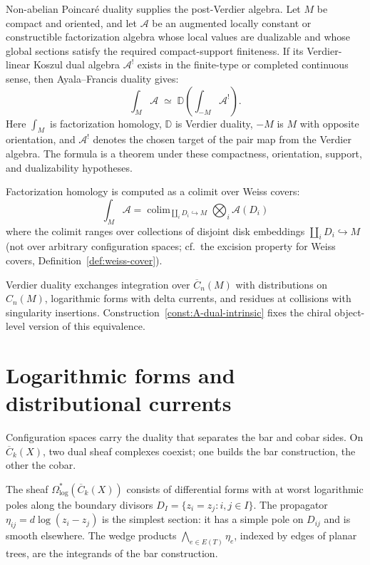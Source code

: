 \begin{remark}\label{rem:NAP-solution}
Non-abelian Poincar\'e duality supplies the post-Verdier algebra.
Let $M$ be compact and oriented, and let $\mathcal{A}$ be an
augmented locally constant or constructible factorization algebra
whose local values are dualizable and whose global sections satisfy
the required compact-support finiteness. If its Verdier-linear
Koszul dual algebra $\mathcal{A}^!$ exists in the finite-type or
completed continuous sense, then Ayala--Francis duality gives:
\[
\int_M \mathcal{A}
\;\simeq\;
\mathbb{D}\!\left(\int_{-M} \mathcal{A}^!\right).
\]
Here $\int_M$ is factorization homology, $\mathbb{D}$ is Verdier
duality, $-M$ is $M$ with opposite orientation, and
$\mathcal{A}^!$ denotes the chosen target of the pair map from the
Verdier algebra. The formula is a theorem under these compactness,
orientation, support, and dualizability hypotheses.

Factorization homology is computed as a colimit over Weiss covers:
\[\int_M \mathcal{A} = \operatorname{colim}_{\coprod_i D_i \hookrightarrow M} \bigotimes_i \mathcal{A}(D_i)\]
where the colimit ranges over collections of disjoint disk embeddings $\coprod_i D_i \hookrightarrow M$ (not over arbitrary configuration spaces; cf.\ the excision property for Weiss covers, Definition~\ref{def:weiss-cover}).

Verdier duality exchanges integration over $\overline{C}_n(M)$
with distributions on $C_n(M)$, logarithmic forms with delta
currents, and residues at collisions with singularity insertions.
Construction~\ref{const:A-dual-intrinsic} fixes the chiral
object-level version of this equivalence.
\end{remark}

\section{Logarithmic forms and distributional currents}
\label{sec:geometric-arena}

Configuration spaces carry the duality that separates the bar and
cobar sides. On $\overline{C}_k(X)$, two dual sheaf complexes
coexist; one builds the bar construction, the other the cobar.

The sheaf $\Omega^*_{\log}(\overline{C}_k(X))$ consists of
differential forms with at worst logarithmic poles along the
boundary divisors $D_I = \{z_i = z_j : i, j \in I\}$. The
propagator $\eta_{ij} = d\log(z_i - z_j)$ is the simplest
section: it has a simple pole on $D_{ij}$ and is smooth elsewhere.
The wedge products $\bigwedge_{e \in E(T)} \eta_e$, indexed by edges
of planar trees, are the integrands of the bar construction.

